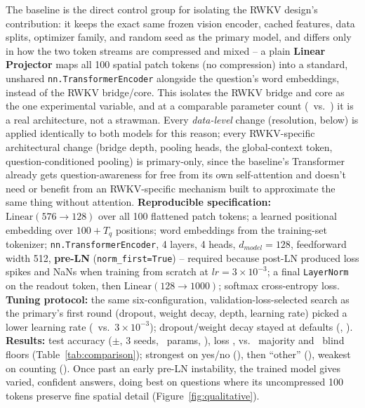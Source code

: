 \documentclass[final]{article}
\begin{document}
The baseline is the direct control group for isolating the RWKV design's contribution: it keeps
the exact same frozen vision encoder, cached features, data splits, optimizer family, and random
seed as the primary model, and differs only in how the two token streams are compressed and mixed
-- a plain \textbf{Linear Projector} maps all 100 spatial patch tokens (no compression) into a
standard, unshared \texttt{nn.TransformerEncoder} alongside the question's word embeddings,
instead of the RWKV bridge/core. This isolates the RWKV bridge and core as the one experimental
variable, and at a comparable parameter count (\baselineParams\ vs.\ \primaryParams) it is a real
architecture, not a strawman. Every \emph{data-level} change (resolution, below) is applied
identically to both models for this reason; every RWKV-specific architectural change (bridge
depth, pooling heads, the global-context token, question-conditioned pooling) is primary-only,
since the baseline's Transformer already gets question-awareness for free from its own
self-attention and doesn't need or benefit from an RWKV-specific mechanism built to approximate
the same thing without attention.
\textbf{Reproducible specification:} $\mathrm{Linear}(576\to128)$
over all 100 flattened patch tokens; a learned positional embedding over $100+T_q$ positions; word
embeddings from the training-set tokenizer; \texttt{nn.TransformerEncoder}, 4 layers, 4 heads,
$d_{model}=128$, feedforward width 512, \textbf{pre-LN} (\texttt{norm\_first=True}) -- required
because post-LN produced loss spikes and NaNs when training from scratch at $lr=3\times10^{-3}$;
a final \texttt{LayerNorm} on the readout token, then $\mathrm{Linear}(128\to1000)$; softmax
cross-entropy loss. \textbf{Tuning protocol:} the same six-configuration, validation-loss-selected
search as the primary's first round (dropout, weight decay, depth, learning rate) picked a lower
learning rate (\baselineTunedLR\ vs.\ $3\times10^{-3}$); dropout/weight decay stayed at defaults
(\baselineTunedDropout, \baselineTunedWeightDecay).
\textbf{Results:} \textbf{\baselineTestAcc} test accuracy ($\pm$\baselineTestAccStd, 3 seeds,
\baselineParams\ params, \baselineSize), loss \baselineTestLoss, vs.\ \textbf{\majorityFloor}
majority and \blindFloor\ blind floors (Table~\ref{tab:comparison}); strongest on yes/no
(\baselineAccYN), then ``other'' (\baselineAccOther), weakest on counting (\baselineAccNum). Once
past an early pre-LN instability, the trained model gives varied, confident answers, doing best on
questions where its uncompressed 100 tokens preserve fine spatial detail (Figure~\ref{fig:qualitative}).
\end{document}
